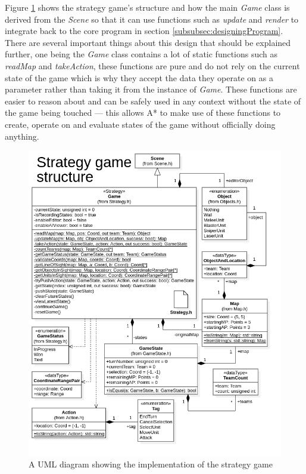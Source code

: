 \documentclass[11pt, a4paper]{article}
\begin{document}
Figure \ref{fig:strategyGameUML} shows the strategy game's structure and how the main \emph{Game} class is derived from the \emph{Scene} so that it can use functions such as \emph{update} and \emph{render} to integrate back to the core program in section \ref{subsubsec:designingProgram}. There are several important things about this design that should be explained further, one being the \emph{Game} class contains a lot of static functions such as \emph{readMap} and \emph{takeAction}, these functions are pure and do not rely on the current state of the game which is why they accept the data they operate on as a parameter rather than taking it from the instance of \emph{Game}. These functions are easier to reason about and can be safely used in any context without the state of the game being touched --- this allows A* to make use of these functions to create, operate on and evaluate states of the game without officially doing anything.

\begin{figure}[!h]
  \centering
  \includegraphics[width=\linewidth]{img/strategy_game_structure.png}
  \caption{A UML diagram showing the implementation of the strategy game}
  \label{fig:strategyGameUML}
\end{figure}
\end{document}
